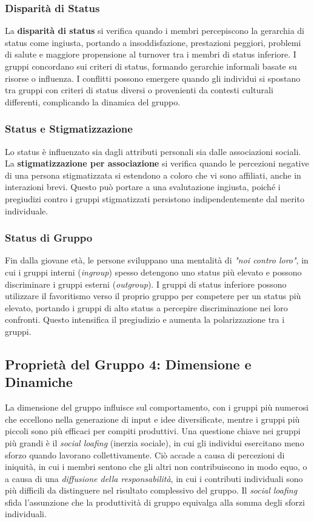 \documentclass{article}
\begin{document}
\subsubsection{Disparità di Status}

La \textbf{disparità di status} si verifica quando i membri percepiscono la gerarchia di status come ingiusta, portando a insoddisfazione, prestazioni peggiori, problemi di salute e maggiore propensione al turnover tra i membri di status inferiore. I gruppi concordano sui criteri di status, formando gerarchie informali basate su risorse o influenza. I conflitti possono emergere quando gli individui si spostano tra gruppi con criteri di status diversi o provenienti da contesti culturali differenti, complicando la dinamica del gruppo.

\subsubsection{Status e Stigmatizzazione}

Lo status è influenzato sia dagli attributi personali sia dalle associazioni sociali. La \textbf{stigmatizzazione per associazione} si verifica quando le percezioni negative di una persona stigmatizzata si estendono a coloro che vi sono affiliati, anche in interazioni brevi. Questo può portare a una svalutazione ingiusta, poiché i pregiudizi contro i gruppi stigmatizzati persistono indipendentemente dal merito individuale.

\subsubsection{Status di Gruppo}

Fin dalla giovane età, le persone sviluppano una mentalità di \textit{"noi contro loro"}, in cui i gruppi interni (\textit{ingroup}) spesso detengono uno status più elevato e possono discriminare i gruppi esterni (\textit{outgroup}). I gruppi di status inferiore possono utilizzare il favoritismo verso il proprio gruppo per competere per un status più elevato, portando i gruppi di alto status a percepire discriminazione nei loro confronti. Questo intensifica il pregiudizio e aumenta la polarizzazione tra i gruppi.


\subsection{Proprietà del Gruppo 4: Dimensione e Dinamiche}
La dimensione del gruppo influisce sul comportamento, con i gruppi più numerosi che eccellono nella generazione di input e idee diversificate, mentre i gruppi più piccoli sono più efficaci per compiti produttivi. Una questione chiave nei gruppi più grandi è il \textit{social loafing} (inerzia sociale), in cui gli individui esercitano meno sforzo quando lavorano collettivamente. Ciò accade a causa di percezioni di iniquità, in cui i membri sentono che gli altri non contribuiscono in modo equo, o a causa di una \textit{diffusione della responsabilità}, in cui i contributi individuali sono più difficili da distinguere nel risultato complessivo del gruppo. Il \textit{social loafing} sfida l'assunzione che la produttività di gruppo equivalga alla somma degli sforzi individuali.
\end{document}
